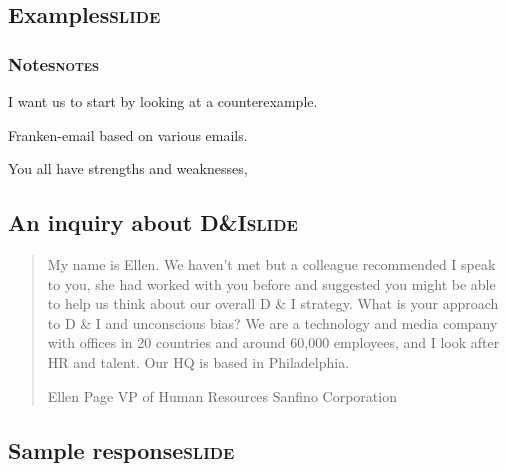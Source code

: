 \documentclass[12pt]{article}
\begin{document}
\subsection[Examples]{Examples\hfill{}\textsc{slide}}
\label{sec:orgcae7a15}

\subsubsection[Notes]{Notes\hfill{}\textsc{notes}}
\label{sec:org9edae31}
I want us to start by looking at a counterexample.

Franken-email based on various emails.

You all have strengths and weaknesses,

\subsection[An inquiry about D\&I]{An inquiry about D\&I\hfill{}\textsc{slide}}
\label{sec:org6394860}

\begin{quote}
My name is Ellen. We haven't met but a colleague recommended I speak to you, she had worked with you before and suggested you might be able to help us think about our overall D \& I strategy. What is your approach to D \& I and unconscious bias? We are a technology and media company with offices in 20 countries and around 60,000 employees, and I look after HR and talent. Our HQ is based in Philadelphia.

Ellen Page
VP of Human Resources
Sanfino Corporation
\end{quote}

\subsection[Sample response]{Sample response\hfill{}\textsc{slide}}
\label{sec:org7efe514}
\end{document}
